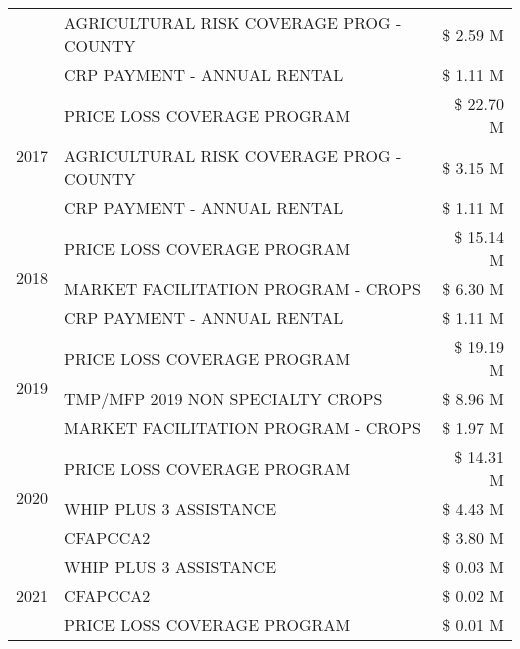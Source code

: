 \begin{tabular}{llr}
 & AGRICULTURAL RISK COVERAGE PROG - COUNTY      & \$ 2.59 M \\
 & CRP PAYMENT - ANNUAL RENTAL                   & \$ 1.11 M \\
\cline{1-3}
\multirow[t]{3}{*}{2017} & PRICE LOSS COVERAGE PROGRAM & \$ 22.70 M \\
 & AGRICULTURAL RISK COVERAGE PROG - COUNTY & \$ 3.15 M \\
 & CRP PAYMENT - ANNUAL RENTAL & \$ 1.11 M \\
\cline{1-3}
\multirow[t]{3}{*}{2018} & PRICE LOSS COVERAGE PROGRAM & \$ 15.14 M \\
 & MARKET FACILITATION PROGRAM - CROPS & \$ 6.30 M \\
 & CRP PAYMENT - ANNUAL RENTAL & \$ 1.11 M \\
\cline{1-3}
\multirow[t]{3}{*}{2019} & PRICE LOSS COVERAGE PROGRAM & \$ 19.19 M \\
 & TMP/MFP 2019 NON SPECIALTY CROPS & \$ 8.96 M \\
 & MARKET FACILITATION PROGRAM - CROPS & \$ 1.97 M \\
\cline{1-3}
\multirow[t]{3}{*}{2020} & PRICE LOSS COVERAGE PROGRAM & \$ 14.31 M \\
 & WHIP PLUS 3 ASSISTANCE & \$ 4.43 M \\
 & CFAPCCA2 & \$ 3.80 M \\
\cline{1-3}
\multirow[t]{3}{*}{2021} & WHIP PLUS 3 ASSISTANCE & \$ 0.03 M \\
 & CFAPCCA2 & \$ 0.02 M \\
 & PRICE LOSS COVERAGE PROGRAM & \$ 0.01 M \\
\cline{1-3}
\bottomrule
\end{tabular}
